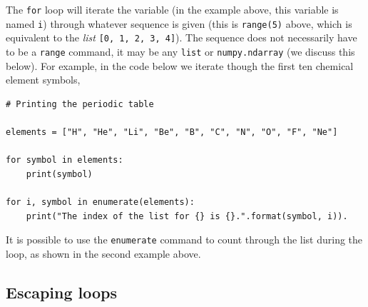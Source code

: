 \documentclass[a4paper]{article}
\begin{document}
The \texttt{for} loop will iterate the variable (in the example above, this variable is named \texttt{i}) through whatever sequence is given (this is \texttt{range(5)} above, which is equivalent to the \emph{list} \texttt{[0, 1, 2, 3, 4]}).
The sequence does not necessarily have to be a \texttt{range} command, it may be any \texttt{list} or \texttt{numpy.ndarray} (we discuss this below).
For example, in the code below we iterate though the first ten chemical element symbols,
\begin{lstlisting}
# Printing the periodic table

elements = ["H", "He", "Li", "Be", "B", "C", "N", "O", "F", "Ne"]

for symbol in elements:
	print(symbol)

for i, symbol in enumerate(elements):
	print("The index of the list for {} is {}.".format(symbol, i)).
\end{lstlisting}
It is possible to use the \texttt{enumerate} command to count through the list during the loop, as shown in the second example above.
\vspace{\baselineskip}
\begin{center}
	\noindent{}
\end{center}

\subsection{Escaping loops}
\end{document}
